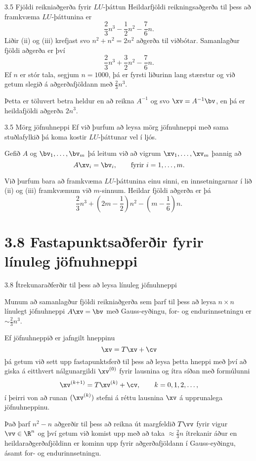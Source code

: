 \begin{frame}{3.5 Fjöldi reikniaðgerða fyrir $LU$-þáttun}
Heildarfjöldi reikningsaðgerða til þess að framkvæma
$LU$-þáttunina er
$$
	\frac 23n^3-\frac 12n^2-\frac 76 n.
$$
Liðir (ii) og (iii) krefjast svo $n^2 + n^2 = 2n^2$ aðgerða til viðbótar.
Samanlagður fjöldi aðgerða er því 
$$
	\frac 23n^3+\frac 32n^2-\frac 76 n.
$$
\pause
\smallskip
Ef $n$ er stór tala, segjum $n=1000$, þá er fyrsti liðurinn lang
stærstur og við getum slegið á aðgerðafjöldann með $\tfrac 23n^3$. 
\pause

Þetta er töluvert betra heldur en að reikna $A^{-1}$ og svo $\xv=A^{-1}\bv$,
en þá er heildafjöldi aðgerða  $2n^3$.
\end{frame}

\begin{frame}{3.5 Mörg jöfnuhneppi}
 Ef við þurfum að leysa mörg jöfnuhneppi með sama stuðlafylkið þá koma
kostir $LU$-þáttunar vel í ljós.
\pause
\smallskip

Gefið $A$ og $\bv_1,\ldots,\bv_m$ þá leitum við að vigrum $\xv_1,\ldots,\xv_m$ þannig að 
$$
A\xv_i = \bv_i, \qquad \text{fyrir } i = 1,\ldots,m.
$$

\pause
\smallskip

Við þurfum bara að framkvæma $LU$-þáttunina einu sinni, en innsetningarnar í 
lið (ii) og (iii) framkvæmum við $m$-sinnum.
Heildar fjöldi aðgerða er þá 
$$
	\frac 23n^3+(2m-\frac 12)n^2- (m-\frac 16) n.
$$
\end{frame}


\section*{3.8 Fastapunktsaðferðir fyrir línuleg jöfnuhneppi}

\begin{frame}{3.8 Ítrekunaraðferðir til þess að leysa línuleg jöfnuhneppi}  

Munum að samanlagður fjöldi reikniaðgerða 
sem þarf til þess að leysa $n\times n$ línulegt jöfnuhneppi
$A\xv=\bv$  með Gauss-eyðingu, for-  og endurinnsetningu er
$\sim \tfrac 23 n^3$.

\pause
\smallskip
Ef jöfnuhneppið er jafngilt hneppinu
$$
\xv=T\xv+\cv
$$
þá getum við sett upp fastapunktsferð til þess að leysa þetta hneppi
með því að giska á eitthvert nálgunargildi $\xv^{(0)}$ fyrir lausnina 
og ítra síðan með formúlunni 
$$
\xv^{(k+1)}=T\xv^{(k)}+\cv, \qquad k=0,1,2,\dots,
$$
í þeirri von að runan $(\xv^{(k)})$ stefni á réttu lausnina $\xv$ á
upprunalega jöfnuhneppinu.

\pause
\smallskip
Það þarf $n^2-n$ aðgerðir til þess að reikna út margfeldið 
$T\vv$ fyrir vigur $\vv\in \R^n$ og því getum við komist upp með að
taka $\approx \tfrac 23 n$ ítrekanir áður en heildaraðgerðafjöldinn
er kominn upp fyrir aðgerðafjöldann í Gauss-eyðingu, ásamt
for- og endurinnsetningu.
\end{frame}

